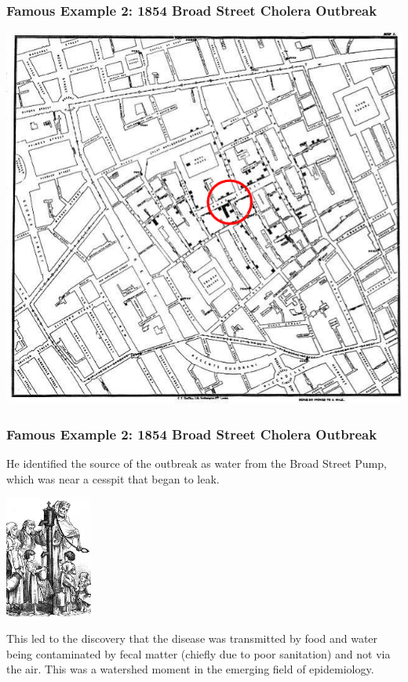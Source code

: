 \documentclass[handout]{beamer}
\newcommand{\blue}[1]{\textcolor{blue2}{#1}}
\begin{document}
\begin{frame}
\frametitle{Famous Example 2:  1854 Broad Street Cholera Outbreak}

\begin{center}
\includegraphics[height=0.8\textheight]{figure/cholera2.png}
\end{center}

\end{frame}


\begin{frame}
\frametitle{Famous Example 2:  1854 Broad Street Cholera Outbreak}

He identified the source of the outbreak as water from the \blue{Broad Street Pump}, which was near a cesspit that began to leak. 

\begin{center}
\includegraphics[height=4cm]{figure/king_cholera.jpg}
\end{center}

\pause This led to the discovery that the disease was transmitted by food and water being contaminated by fecal matter (chiefly due to poor sanitation) and not via the air.  This was a watershed moment in the emerging field of \blue{epidemiology}.  

\end{frame}
\end{document}
